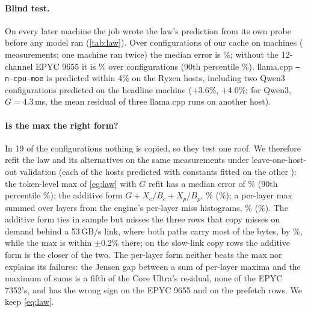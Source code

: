 \documentclass[10pt,twocolumn]{article}
\begin{document}


\paragraph{Blind test.} On every later machine the job wrote the law's prediction from its own probe before any model
ran (\cref{tab:law}). Over \lawCfg{} configurations of our cache on \lawHosts{} machines (\lawMeas{} measurements; one
machine ran twice) the median error is \lawMedian\%; without the 12-channel EPYC 9655 it is \lawDeskMedian\% over
\lawDeskN{} configurations (90th percentile \lawDeskPninety\%). llama.cpp \texttt{--n-cpu-moe} is predicted within 4\% on
the Ryzen hosts, including two Qwen3 configurations predicted on the headline machine (+3.6\%, +4.0\%; for Qwen3,
$G{=}4.3$\,ms, the mean residual of three llama.cpp runs on another host).

\paragraph{Is the max the right form?} In 19 of the \lawCfg{} configurations nothing is copied, so they test one
roof. We therefore refit the law and its alternatives on the same \lawRows{} measurements under leave-one-host-out
validation (each of the \lawHostsLoho{} hosts predicted with constants fitted on the other \lawHostsLohoOther): the token-level max of
\cref{eq:law} with $G$ refit has a median error of \lohoMaxMed\% (90th percentile \lohoMaxPninety\%); the additive form
$G+X_c/B_c+X_p/B_p$, \lohoAddMed\% (\lohoAddPninety\%); a per-layer max summed over layers from the engine's per-layer
miss histograms, \lohoLayerMed\% (\lohoLayerPninety\%). The additive form ties in sample but misses the three
rows that copy misses on demand behind a 53\,GB/s link, where both paths carry most of the bytes, by
\lohoAddFastFetchMin\%, while the max is within $\pm$0.2\% there; on the slow-link copy rows the additive form is the
closer of the two. The per-layer form neither beats the max nor explains its failures: the Jensen gap between a sum
of per-layer maxima and the maximum of sums is a fifth of the Core Ultra's residual, none of the EPYC 7352's, and has
the wrong sign on the EPYC 9655 and on the prefetch rows. We keep \cref{eq:law}.
\end{document}
